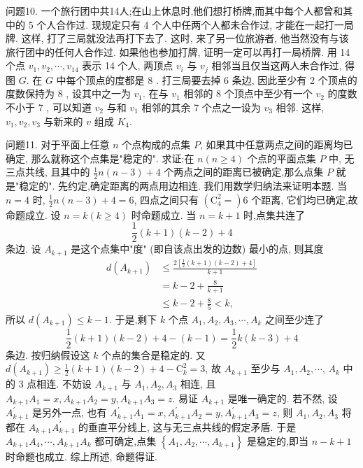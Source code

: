 问题10. 一个旅行团中共14人;在山上休息时,他们想打桥牌,而其中每个人都曾和其中的 5 个人合作过.
现规定只有 4 个人中任两个人都未合作过, 才能在一起打一局牌.
这样, 打了三局就没法再打下去了.
这时, 来了另一位旅游者, 他当然没有与该旅行团中的任何人合作过.
如果他也参加打牌, 证明一定可以再打一局桥牌.
用 14 个点 $v_1, v_2, \cdots, v_{14}$ 表示 14 个人, 两顶点 $v_i$ 与 $v_j$ 相邻当且仅当这两人未合作过, 得图 $G$. 在 $G$ 中每个顶点的度都是 8 . 打三局要去掉 6 条边, 因此至少有 2 个顶点的度数保持为 8 , 设其中之一为 $v_1$. 在与 $v_1$ 相邻的 8
个顶点中至少有一个 $v_2$ 的度数不小于 7 , 可以知道 $v_2$ 与和 $v_1$ 相邻的其余 7 个点之一设为 $v_3$ 相邻.
这样, $v_1, v_2, v_3$ 与新来的 $v$ 组成 $K_4$.



问题11. 对于平面上任意 $n$ 个点构成的点集 $P$, 如果其中任意两点之间的距离均已确定, 那么就称这个点集是"稳定的". 求证:在 $n(n \geqslant 4)$ 个点的平面点集 $P$ 中, 无三点共线, 且其中的 $\frac{1}{2} n(n-3)+4$ 个两点之间的距离已被确定,那么点集 $P$ 就是"稳定的".
先约定,确定距离的两点用边相连.
我们用数学归纳法来证明本题.
当 $n=4$ 时, $\frac{1}{2} n(n-3)+4=6$, 四点之间只有 $\left(\mathrm{C}_4^2=\right) 6$ 个距离, 它们均已确定,故命题成立.
设 $n=k(k \geqslant 4)$ 时命题成立.
当 $n=k+1$ 时,点集共连了
$$
\frac{1}{2}(k+1)(k-2)+4
$$
条边.
设 $A_{k+1}$ 是这个点集中"度" (即自该点出发的边数) 最小的点, 则其度
$$
\begin{aligned}
d\left(A_{k+1}\right) & \leqslant \frac{2\left[\frac{1}{2}(k+1)(k-2)+4\right]}{k+1} \\
& =k-2+\frac{8}{k+1} \\
& \leqslant k-2+\frac{8}{5}<k,
\end{aligned}
$$
所以 $d\left(A_{k+1}\right) \leqslant k-1$.
于是,剩下 $k$ 个点 $A_1, A_2, A_3, \cdots, A_k$ 之间至少连了
$$
\frac{1}{2}(k+1)(k-2)+4-(k-1)=\frac{1}{2} k(k-3)+4
$$
条边.
按归纳假设这 $k$ 个点的集合是稳定的.
又 $d\left(A_{k+1}\right) \geqslant \frac{1}{2}(k+1)(k-2)+4-\mathrm{C}_k^2=3$, 故 $A_{k+1}$ 至少与 $A_1, A_2, \cdots$, $A_k$ 中的 3 点相连.
不妨设 $A_{k+1}$ 与 $A_1, A_2, A_3$ 相连, 且 $A_{k+1} A_1=x, A_{k+1} A_2= y, A_{k+1} A_3=z$. 易证 $A_{k+1}$ 是唯一确定的.
若不然, 设 $A_{k+1}^{\prime}$ 是另外一点, 也有 $A_{k+1}^{\prime} A_1=x, A_{k+1}^{\prime} A_2=y, A_{k+1}^{\prime} A_3=z$, 则 $A_1, A_2, A_3$ 将都在 $A_{k+1} A_{k+1}^{\prime}$ 的垂直平分线上, 这与无三点共线的假定矛盾.
于是 $A_{k+1} A_4, \cdots, A_{k+1} A_k$ 都可确定,点集 $\left\{A_1, A_2, \cdots, A_{k+1}\right\}$ 是稳定的,即当 $n-k+1$ 时命题也成立.
综上所述, 命题得证.



